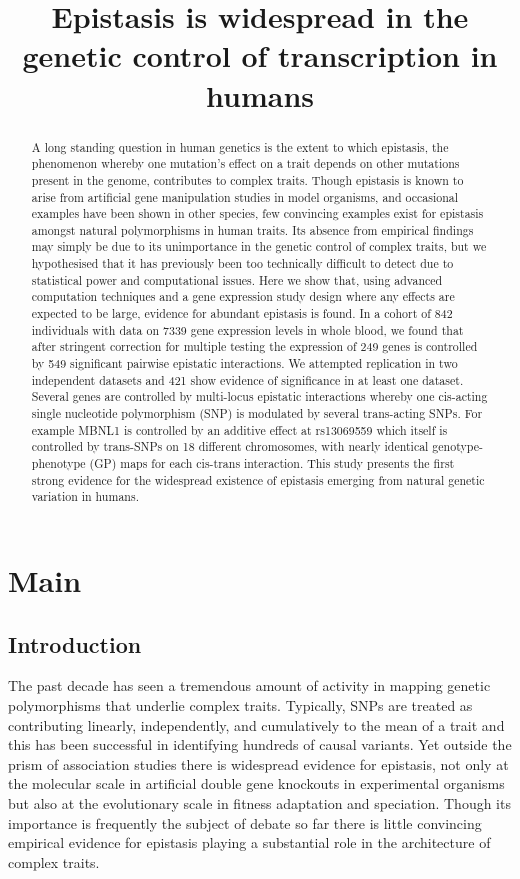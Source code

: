 \documentclass{article}
\title{Epistasis is widespread in the genetic control of transcription in humans}
\begin{document}
\maketitle


\begin{abstract}
A long standing question in human genetics is the extent to which epistasis, the phenomenon whereby one mutation's effect on a trait depends on other mutations present in the genome, contributes to complex traits. Though epistasis is known to arise from artificial gene manipulation studies in model organisms, and occasional examples have been shown in other species, few convincing examples exist for epistasis amongst natural polymorphisms in human traits. Its absence from empirical findings may simply be due to its unimportance in the genetic control of complex traits, but we hypothesised that it has previously been too technically difficult to detect due to statistical power and computational issues. Here we show that, using advanced computation techniques and a gene expression study design where any effects are expected to be large, evidence for abundant epistasis is found. In a cohort of 842 individuals with data on 7339 gene expression levels in whole blood, we found that after stringent correction for multiple testing the expression of 249 genes is controlled by 549 significant pairwise epistatic interactions. We attempted replication in two independent datasets and 421 show evidence of significance in at least one dataset. Several genes are controlled by multi-locus epistatic interactions whereby one cis-acting single nucleotide polymorphism (SNP) is modulated by several trans-acting SNPs. For example MBNL1 is controlled by an additive effect at rs13069559 which itself is controlled by trans-SNPs on 18 different chromosomes, with nearly identical genotype-phenotype (GP) maps for each cis-trans interaction. This study presents the first strong evidence for the widespread existence of epistasis emerging from natural genetic variation in humans.
\end{abstract}


\section{Main}

\subsection{Introduction}
The past decade has seen a tremendous amount of activity in mapping genetic polymorphisms that underlie complex traits. Typically, SNPs are treated as contributing linearly, independently, and cumulatively to the mean of a trait and this has been successful in identifying hundreds of causal variants. Yet outside the prism of association studies there is widespread evidence for epistasis, not only at the molecular scale in artificial double gene knockouts in experimental organisms but also at the evolutionary scale in fitness adaptation and speciation. Though its importance is frequently the subject of debate so far there is little convincing empirical evidence for epistasis playing a substantial role in the architecture of complex traits.
\end{document}
